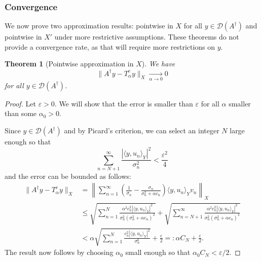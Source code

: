 \documentclass{article}
\newtheorem{theorem}{Theorem}[section]
\theoremstyle{definition}
\newcommand{\smallnorm}[1]{\lVert#1\rVert}
\newcommand{\norm}[1]{\left\lVert#1\right\rVert}
\newcommand{\abs}[1]{\left\lvert#1\right\rvert}
\newcommand{\domainsymb}{\mathcal{D}}
\newcommand{\domain}[1]{\domainsymb({#1})}
\newcommand{\pseudoinv}[1]{{#1}^\dagger}
\begin{document}
\subsubsection{Convergence}
We now prove two  approximation results: pointwise in $X$ for all $y \in \mathcal{D}(A^\dagger)$ and pointwise in $X'$ under more restrictive assumptions. 
These theorems do not provide a convergence rate, as that will require more restrictions on \(y\).


\begin{theorem}[Pointwise approximation in \(X\)]
\label{thm:spectralfilter_pwl2approx}
    We have
    \begin{equation*}
        \smallnorm{\pseudoinv{A} y - T^c_\alpha y}_X
        \xrightarrow[\alpha\to 0]{}0
    \end{equation*}
    for all \(y\in \domain{\pseudoinv{A}}\).
\end{theorem}


\begin{proof}
Let \(\varepsilon>0\).
We will show that the error is smaller than \(\varepsilon\) for all \(\alpha\) smaller than some \(\alpha_0>0\).

Since \(y\in\domain{\pseudoinv{A}}\) and by Picard's criterion,
we can select an integer \(N\) large enough so that
\begin{equation*}
    \sum_{n=N+1}^\infty \frac{\abs{\langle y,u_n\rangle_Y}^2}{\sigma_n^2} <  \frac{\varepsilon^2}{4}
\end{equation*}
and the error can be bounded as follows:
\begin{align*}
    \smallnorm{\pseudoinv{A} y - T^c_\alpha y}_X
    &=
    \norm{
    \sum_{n=1}^\infty \left( \frac{1}{\sigma_n} - \frac{\sigma_n}{\sigma_n^2+\alpha c_n} \right) \langle y, u_n\rangle_Y v_n
    }_X
       \\&\leq
    \sqrt{
    \sum_{n=1}^N 
    \frac{\alpha^2c_n^2 \abs{\langle y, u_n\rangle_Y}^2}{\sigma_n^2\left(\sigma_n^2+\alpha c_n\right)^2}
    }
    +
    \sqrt{\sum_{n=N+1}^\infty \frac{\alpha^2 c_n^2 \abs{\langle y,u_n\rangle_Y}^2}{\sigma_n^2 \left(\sigma_n^2+\alpha c_n\right)^2}}
    \\&<
    \alpha
    \sqrt{
    \sum_{n=1}^N 
    \frac{c_n^2 \abs{\langle y, u_n\rangle_Y}^2}{\sigma_n^6}
    }    
    +\frac{\varepsilon}{2}=:
    \alpha
    C_N
    +\frac{\varepsilon}{2}.
\end{align*}
The result now follows by choosing \(\alpha_0\) small enough so that \(\alpha_0 C_N < \varepsilon/2\). 
\end{proof}
\end{document}
